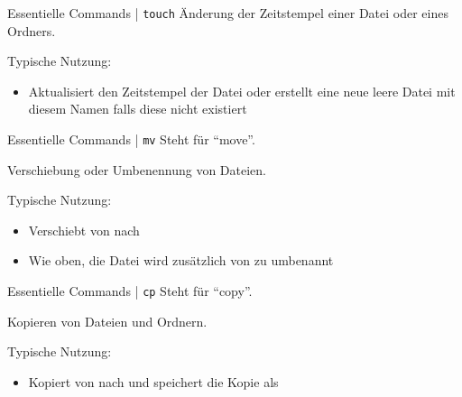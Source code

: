 \documentclass{setbeamer}
\begin{document}
\begin{frame}{Essentielle Commands | \texttt{touch}}
    Änderung der Zeitstempel einer Datei oder eines Ordners.

    \vspace{0.3cm}

    Typische Nutzung:
    \begin{itemize}
        \item {}\textemdash Aktualisiert den Zeitstempel der Datei  oder erstellt eine neue leere Datei mit diesem Namen falls diese nicht existiert
    \end{itemize}
\end{frame}

\begin{frame}{Essentielle Commands | \texttt{mv}}
    Steht für ``move''.

    \vspace{0.3cm}

    Verschiebung oder Umbenennung von Dateien.

    \vspace{0.3cm}

    Typische Nutzung:
    \begin{itemize}
        \item {}\textemdash Verschiebt  von  nach 
        \item {}\textemdash Wie oben, die Datei wird zusätzlich von  zu  umbenannt
    \end{itemize}
\end{frame}

\begin{frame}{Essentielle Commands | \texttt{cp}}
    Steht für ``copy''.

    \vspace{0.3cm}

    Kopieren von Dateien und Ordnern.

    \vspace{0.3cm}

    Typische Nutzung:
    \begin{itemize}
        \item {}\textemdash Kopiert  von  nach  und speichert die Kopie als 
    \end{itemize}
\end{frame}
\end{document}
